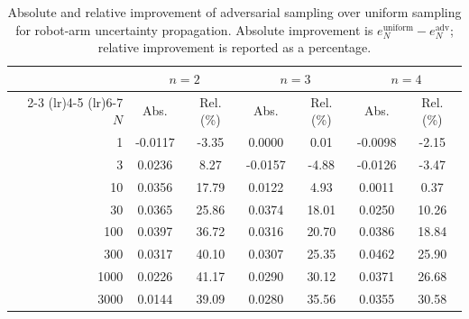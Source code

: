 \begin{table}[t]
\centering
\caption{Absolute and relative improvement of adversarial sampling over uniform sampling for robot-arm uncertainty propagation. Absolute improvement is $e_N^{\mathrm{uniform}} - e_N^{\mathrm{adv}}$; relative improvement is reported as a percentage.}
\label{tab:robotarm-adv-improvement-combined}
\begin{tabular}{rcc cc cc}
\toprule
 & \multicolumn{2}{c}{$n=2$} & \multicolumn{2}{c}{$n=3$} & \multicolumn{2}{c}{$n=4$} \\
\cmidrule(lr){2-3} \cmidrule(lr){4-5} \cmidrule(lr){6-7}
$N$ & Abs. & Rel. (\%) & Abs. & Rel. (\%) & Abs. & Rel. (\%) \\
\midrule
1 & -0.0117 & -3.35 & 0.0000 & 0.01 & -0.0098 & -2.15 \\
3 & 0.0236 & 8.27 & -0.0157 & -4.88 & -0.0126 & -3.47 \\
10 & 0.0356 & 17.79 & 0.0122 & 4.93 & 0.0011 & 0.37 \\
30 & 0.0365 & 25.86 & 0.0374 & 18.01 & 0.0250 & 10.26 \\
100 & 0.0397 & 36.72 & 0.0316 & 20.70 & 0.0386 & 18.84 \\
300 & 0.0317 & 40.10 & 0.0307 & 25.35 & 0.0462 & 25.90 \\
1000 & 0.0226 & 41.17 & 0.0290 & 30.12 & 0.0371 & 26.68 \\
3000 & 0.0144 & 39.09 & 0.0280 & 35.56 & 0.0355 & 30.58 \\
\bottomrule
\end{tabular}
\end{table}
